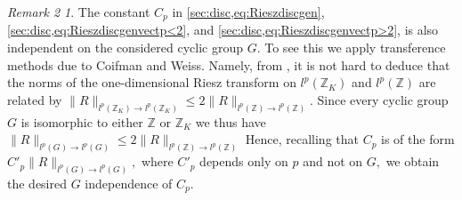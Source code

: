 \documentclass[leqno,12pt]{amsart}
\theoremstyle{definition}
\theoremstyle{remark}
\newtheorem*{remark2}{Remark 2}
\begin{document}
\begin{remark2}
The constant $C_p$ in \eqref{sec:disc,eq:Rieszdiscgen}, \eqref{sec:disc,eq:Rieszdiscgenvectp<2}, and \eqref{sec:disc,eq:Rieszdiscgenvectp>2}, is also independent on the considered cyclic group $G.$ To see this we apply transference methods due to Coifman and Weiss. Namely, from \cite[Corollary 3.16]{CWtr}, it is not hard to deduce that the norms of the one-dimensional Riesz transform on $l^p(\mathbb{Z}_K)$ and $l^p(\mathbb{Z})$ are related by $\|R\|_{l^p(\mathbb{Z}_K) \to l^p(\mathbb{Z}_K)}\leq 2\|R\|_{l^p(\mathbb{Z})\to l^p(\mathbb{Z})}.$ Since every cyclic group $G$ is isomorphic to either $\mathbb{Z}$ or $\mathbb{Z}_K$ we thus have $\|R\|_{l^p(G) \to l^p(G)}\leq 2\|R\|_{l^p(\mathbb{Z})\to l^p(\mathbb{Z})}$ Hence, recalling that $C_p$ is of the form $C'_{p}\|R\|_{l^p(G) \to l^p(G)},$ where $C'_p$ depends only on $p$ and not on $G,$ we obtain the desired $G$ independence of $C_p.$
\end{remark2}
\end{document}
